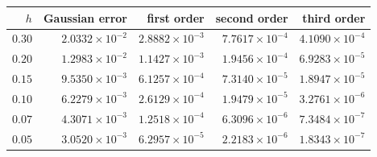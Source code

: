 \begin{tabular}{@{}rrrrr@{}}
\toprule
$h$ & Gaussian error & first order & second order & third order\\
\midrule
$0.30$ & $2.0332\times 10^{-2}$ & $2.8882\times 10^{-3}$ & $7.7617\times 10^{-4}$ & $4.1090\times 10^{-4}$\\
$0.20$ & $1.2983\times 10^{-2}$ & $1.1427\times 10^{-3}$ & $1.9456\times 10^{-4}$ & $6.9283\times 10^{-5}$\\
$0.15$ & $9.5350\times 10^{-3}$ & $6.1257\times 10^{-4}$ & $7.3140\times 10^{-5}$ & $1.8947\times 10^{-5}$\\
$0.10$ & $6.2279\times 10^{-3}$ & $2.6129\times 10^{-4}$ & $1.9479\times 10^{-5}$ & $3.2761\times 10^{-6}$\\
$0.07$ & $4.3071\times 10^{-3}$ & $1.2518\times 10^{-4}$ & $6.3096\times 10^{-6}$ & $7.3484\times 10^{-7}$\\
$0.05$ & $3.0520\times 10^{-3}$ & $6.2957\times 10^{-5}$ & $2.2183\times 10^{-6}$ & $1.8343\times 10^{-7}$\\
\bottomrule
\end{tabular}
